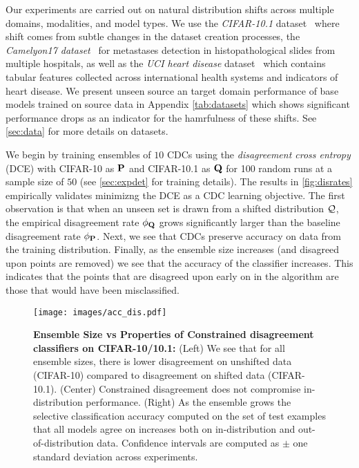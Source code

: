 Our experiments are carried out on natural distribution shifts across multiple domains, modalities, and model types.
We use the \textit{CIFAR-10.1} dataset~\citep{cifar101} where shift comes from subtle changes in the dataset creation processes,
the \textit{Camelyon17 dataset}~\citep{camelyon} for metastases detection in histopathological slides from multiple hospitals, as well as the \textit{UCI heart disease} dataset~\citep{misc_heart_disease_45} which contains tabular features collected across international health systems and indicators of heart disease.
We present unseen source an target domain performance of base models trained on source data in Appendix \autoref{tab:datasets} which shows significant performance drops as an indicator for the hamrfulness of these shifts.
See \autoref{sec:data} for more details on datasets.

We begin by training ensembles of $10$ CDCs using the \textit{disagreement cross entropy} (DCE) with CIFAR-10 as $\mathbf{P}$ and CIFAR-10.1 as $\mathbf{Q}$ for 100 random runs at a sample size of $50$ (see \autoref{sec:expdet} for training details).
The results in \autoref{fig:disrates} empirically validates minimizng the DCE as a CDC learning objective.
The first observation is that when an unseen set is drawn from a shifted distribution $\mathcal{Q}$, the empirical disagreement rate $\phi_{\mathbf{Q}}$ grows significantly larger
than the baseline disagreement rate $\phi_{\mathbf{P}}$.
Next, we see that CDCs preserve accuracy on data from the training distribution.
Finally, as the ensemble size increases (and disagreed upon points are removed) we see that the accuracy of the classifier increases.
This indicates that the points that are disagreed upon early on in the algorithm are those that would have been misclassified.

\begin{figure}[!htb]
    \vspace{-3mm}
    \centering
    \texttt{[image: images/acc\_dis.pdf]}
    \vspace{-7mm}
    \caption{\small \textbf{Ensemble Size vs Properties of Constrained disagreement classifiers on CIFAR-10/10.1:}
    (Left) We see that for all ensemble sizes, there is lower disagreement on unshifted data (CIFAR-10) compared to disagreement on shifted data (CIFAR-10.1). (Center) Constrained disagreement does not compromise in-distribution performance.
        (Right) As the ensemble grows the selective classification accuracy computed on the set of test examples that all models agree on increases both on in-distribution and out-of-distribution data.
        Confidence intervals are computed as $\pm$ one standard deviation across experiments.}
    \label{fig:disrates}
    \vspace{-1mm}
\end{figure}

